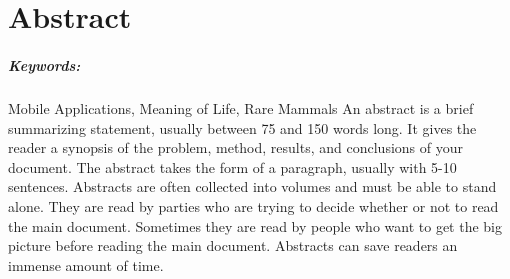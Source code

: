 \cleardoublepage

 \setcounter{page}{1}
\chapter*{Abstract}

\paragraph{Keywords:} Mobile Applications, Meaning of Life, Rare Mammals
\newline \newline
An abstract is a brief summarizing statement, usually between 75 and
150 words long. It gives the reader a synopsis of the problem,
method, results, and conclusions of your document. The abstract
takes the form of a paragraph, usually with 5-10 sentences.
Abstracts are often collected into volumes and must be able to stand
alone. They are read by parties who are trying to decide whether or
not to read the main document. Sometimes they are read by people who
want to get the big picture before reading the main document.
Abstracts can save readers an immense amount of time.
